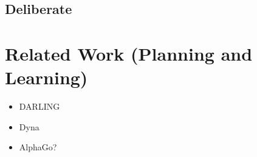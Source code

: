\subsection{Deliberate}


\section{Related Work (Planning and Learning)}
\begin{itemize}
    \item DARLING
    \item Dyna
    \item AlphaGo?
\end{itemize}
